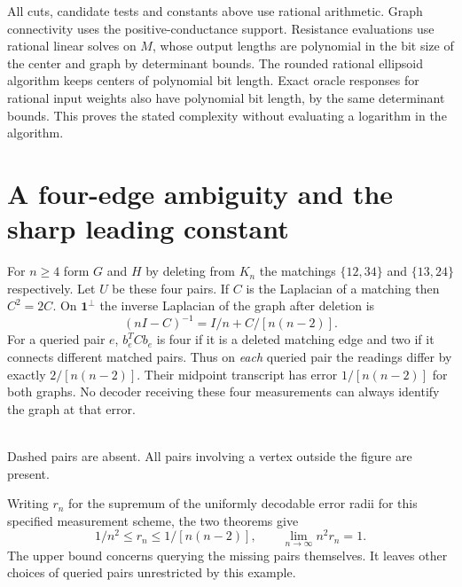 \documentclass[11pt]{article}
\newcommand{\one}{\mathbf 1}
\begin{document}
All cuts, candidate tests and constants above use rational arithmetic. Graph connectivity uses the positive-conductance support. Resistance evaluations use rational linear solves on $M$, whose output lengths are polynomial in the bit size of the center and graph by determinant bounds. The rounded rational ellipsoid algorithm keeps centers of polynomial bit length. Exact oracle responses for rational input weights also have polynomial bit length, by the same determinant bounds. This proves the stated complexity without evaluating a logarithm in the algorithm.

\section*{A four-edge ambiguity and the sharp leading constant}
For $n\ge4$ form $G$ and $H$ by deleting from $K_n$ the matchings $\{12,34\}$ and $\{13,24\}$ respectively. Let $U$ be these four pairs. If $C$ is the Laplacian of a matching then $C^2=2C$. On $\one^\perp$ the inverse Laplacian of the graph after deletion is
\[
            (nI-C)^{-1}=I/n+C/[n(n-2)].
\]
For a queried pair $e$, $b_e^TCb_e$ is four if it is a deleted matching edge and two if it connects different matched pairs. Thus on \emph{each} queried pair the readings differ by exactly $2/[n(n-2)]$. Their midpoint transcript has error $1/[n(n-2)]$ for both graphs. No decoder receiving these four measurements can always identify the graph at that error.
\begin{center}
\\
{\small Dashed pairs are absent. All pairs involving a vertex outside the figure are present.}
\end{center}
Writing $r_n$ for the supremum of the uniformly decodable error radii for this specified measurement scheme, the two theorems give
\[
            1/n^2\le r_n\le 1/[n(n-2)],\qquad \lim_{n\to\infty} n^2 r_n=1 .
\]
The upper bound concerns querying the missing pairs themselves. It leaves other choices of queried pairs unrestricted by this example.
\end{document}
